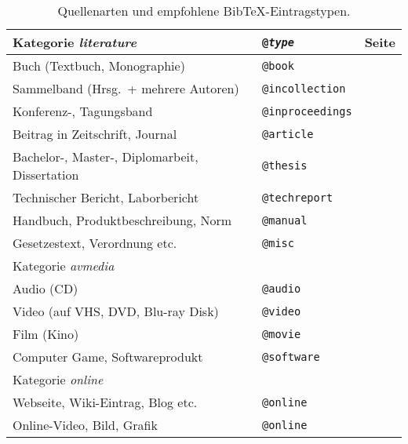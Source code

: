 \begin{table}
\caption{Quellenarten und empfohlene BibTeX-Eintragstypen.}
\label{tab:QuellenUndEintragstypen}
\centering
\begin{tabular}{llc}
	\hline
	Kategorie \emph{literature} & \texttt{@\emph{type}} & Seite\\
	\hline
	Buch (Textbuch, Monographie) & \texttt{@book} & \pageref{sec:@book}\\
	Sammelband (Hrsg.\ + mehrere Autoren) & \texttt{@incollection} & \pageref{sec:@incollection} \\
	Konferenz-, Tagungsband & \texttt{@inproceedings} & \pageref{sec:@inproceedings}\\
	Beitrag in Zeitschrift, Journal & \texttt{@article} & \pageref{sec:@article}\\
	Bachelor-, Master-, Diplomarbeit, Dissertation & \texttt{@thesis} & \pageref{sec:@thesis}\\
	Technischer Bericht, Laborbericht & \texttt{@techreport} & \pageref{sec:@techreport}\\
	Handbuch, Produktbeschreibung, Norm & \texttt{@manual} & \pageref{sec:@manual}\\
	Gesetzestext, Verordnung etc. & \texttt{@misc} & \pageref{sec:@misc}\\
%
	\hline
	Kategorie \emph{avmedia} & \\
	\hline
	Audio (CD) & \texttt{@audio} & \pageref{sec:@audio}\\
	Video (auf VHS, DVD, Blu-ray Disk) & \texttt{@video} & \pageref{sec:@video}\\
	Film (Kino) & \texttt{@movie} & \pageref{sec:@movie}\\
	Computer Game, Softwareprodukt & \texttt{@software} & \pageref{sec:@software}\\
%
	\hline
	Kategorie \emph{online} & \\
	\hline
	Webseite, Wiki-Eintrag, Blog etc. & \texttt{@online} & \pageref{sec:@online-www}\\
	Online-Video, Bild, Grafik & \texttt{@online} & \pageref{sec:@online-video}\\
\end{tabular}
\end{table}


